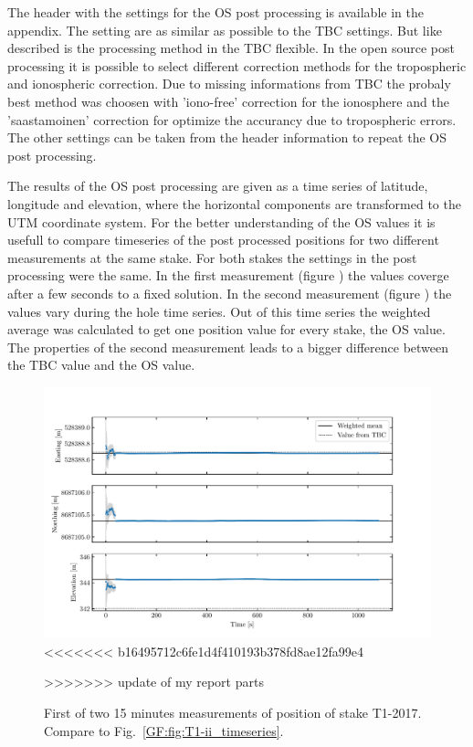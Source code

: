 The header with the settings for the OS post processing is available in the appendix.
The setting are as similar as possible to the TBC settings.
But like described is the processing method in the TBC flexible.
In the open source post processing it is possible to select different correction methods for the tropospheric and ionospheric correction. 
Due to missing informations from TBC the probaly best method was choosen with 'iono-free' correction for the ionosphere and the 'saastamoinen' correction for optimize the accurancy due to tropospheric errors. 
The other settings can be taken from the header information to repeat the OS post processing. 
\medskip

The results of the OS post processing are given as a time series of latitude, longitude and elevation, where the horizontal components are transformed to the UTM coordinate system. 
For the better understanding of the OS values it is usefull to compare timeseries of the post processed positions for two different measurements at the same stake.
For both stakes the settings in the post processing were the same.
In the first measurement (figure \label{GPS:fig:T1-i_timeseries}) the values coverge after a few seconds to a fixed solution.
In the second measurement (figure \label{GPS:fig:T1-ii_timeseries}) the values vary during the hole time series.
Out of this time series the weighted average was calculated to get one position value for every stake, the OS value.
The properties of the second measurement leads to a bigger difference between the TBC value and the OS value.

\begin{figure}[H]
    \centering
    \includegraphics[width=\textwidth]{./figs/timeseries/46250700_corr-T1-i-2017_Timeseries-east-north-elev.pdf}
<<<<<<< b16495712c6fe1d4f410193b378fd8ae12fa99e4
    \caption{First of two 15 minutes measurements of position of stake T1-2017. Compare to Fig.~\ref{GF:fig:T1-ii_timeseries}.}
    \label{GPS:fig:T1-i_timeseries}
>>>>>>> update of my report parts
\end{figure}

